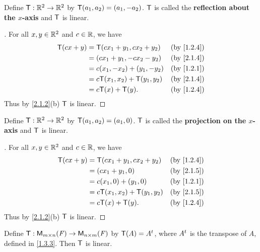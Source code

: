 \begin{eg}\label{2.1.4}
	Define \(\mathsf{T} : \mathbb{R}^2 \to \mathbb{R}^2\) by \(\mathsf{T}(a_1, a_2) = (a_1, -a_2)\).
	\(\mathsf{T}\) is called the \textbf{reflection about the \(x\)-axis} and \(\mathsf{T}\) is linear.
\end{eg}

\begin{proof}[]
	For all \(x, y \in \mathbb{R}^2\) and \(c \in \mathbb{R}\), we have
	\begin{align*}
		\T(cx + y) & = \T(cx_1 + y_1, cx_2 + y_2)   &  & \by{1.2.4} \\
		           & = (cx_1 + y_1, -cx_2 - y_2)    &  & \by{2.1.4} \\
		           & = c(x_1, -x_2) + (y_1, -y_2)   &  & \by{1.2.1} \\
		           & = c\T(x_1, x_2) + \T(y_1, y_2) &  & \by{2.1.4} \\
		           & = c\T(x) + \T(y).              &  & \by{1.2.4}
	\end{align*}
	Thus by \cref{2.1.2}(b) \(\mathsf{T}\) is linear.
\end{proof}

\begin{eg}\label{2.1.5}
	Define \(\mathsf{T} : \mathbb{R}^2 \to \mathbb{R}^2\) by \(\mathsf{T}(a_1, a_2) = (a_1, 0)\).
	\(\mathsf{T}\) is called the \textbf{projection on the \(x\)-axis} and \(\mathsf{T}\) is linear.
\end{eg}

\begin{proof}[]
	For all \(x, y \in \mathbb{R}^2\) and \(c \in \mathbb{R}\), we have
	\begin{align*}
		\T(cx + y) & = \T(cx_1 + y_1, cx_2 + y_2)   &  & \by{1.2.4} \\
		           & = (cx_1 + y_1, 0)              &  & \by{2.1.5} \\
		           & = c(x_1, 0) + (y_1, 0)         &  & \by{1.2.1} \\
		           & = c\T(x_1, x_2) + \T(y_1, y_2) &  & \by{2.1.5} \\
		           & = c\T(x) + \T(y).              &  & \by{1.2.4}
	\end{align*}
	Thus by \cref{2.1.2}(b) \(\mathsf{T}\) is linear.
\end{proof}

\begin{eg}\label{2.1.6}
	Define \(\mathsf{T} : \mathsf{M}_{{m} \times n}({\mathit{F}}) \to \mathsf{M}_{{n} \times m}({\mathit{F}})\) by \(\mathsf{T}(A) = {A}^{t}\), where \({A}^{t}\) is the transpose of \(A\), defined in \cref{1.3.3}.
	Then \(\mathsf{T}\) is linear.
\end{eg}

